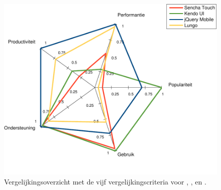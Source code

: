 \begin{figure}[H]
  \centering
  \includegraphics[width=\textwidth]{figuren/spidergraph-final.pdf}
  \caption{Vergelijkingsoverzicht met de vijf vergelijkingscriteria voor \st{},  \kendo{},  \jqm{} en \lungo{}.}
  \label{fig:spinnenweb-final}
\end{figure}

